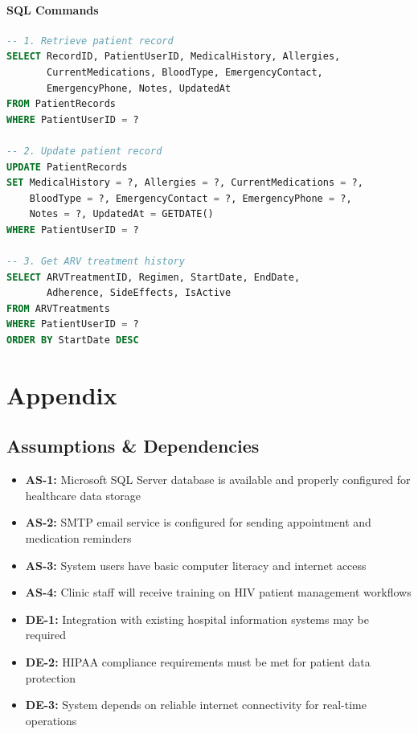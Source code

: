 \documentclass[12pt,a4paper]{article}
\begin{document}
\paragraph{SQL Commands}

\begin{lstlisting}[language=SQL]
-- 1. Retrieve patient record
SELECT RecordID, PatientUserID, MedicalHistory, Allergies, 
       CurrentMedications, BloodType, EmergencyContact, 
       EmergencyPhone, Notes, UpdatedAt
FROM PatientRecords
WHERE PatientUserID = ?

-- 2. Update patient record
UPDATE PatientRecords
SET MedicalHistory = ?, Allergies = ?, CurrentMedications = ?,
    BloodType = ?, EmergencyContact = ?, EmergencyPhone = ?,
    Notes = ?, UpdatedAt = GETDATE()
WHERE PatientUserID = ?

-- 3. Get ARV treatment history
SELECT ARVTreatmentID, Regimen, StartDate, EndDate, 
       Adherence, SideEffects, IsActive
FROM ARVTreatments
WHERE PatientUserID = ?
ORDER BY StartDate DESC
\end{lstlisting}

\section{Appendix}

\subsection{Assumptions \& Dependencies}

\begin{itemize}
    \item \textbf{AS-1:} Microsoft SQL Server database is available and properly configured for healthcare data storage
    \item \textbf{AS-2:} SMTP email service is configured for sending appointment and medication reminders
    \item \textbf{AS-3:} System users have basic computer literacy and internet access
    \item \textbf{AS-4:} Clinic staff will receive training on HIV patient management workflows
    \item \textbf{DE-1:} Integration with existing hospital information systems may be required
    \item \textbf{DE-2:} HIPAA compliance requirements must be met for patient data protection
    \item \textbf{DE-3:} System depends on reliable internet connectivity for real-time operations
\end{itemize}
\end{document}
